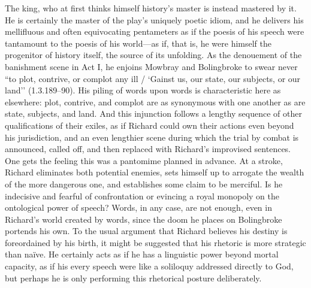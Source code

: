 The king, who at first thinks himself history’s master is instead mastered by it.
He is certainly the master of the play’s uniquely poetic idiom, and he delivers his mellifluous and often equivocating pentameters as if the poesis of his speech were tantamount to the poesis of his world---as if, that is, he were himself the progenitor of history itself, the source of its unfolding.
As the denouement of the banishment scene in Act I, he enjoins Mowbray and Bolingbroke to swear never ``to plot, contrive, or complot any ill / ‘Gainst us, our state, our subjects, or our land’’ (1.3.189--90).
His piling of words upon words is characteristic here as elsewhere: plot, contrive, and complot are as synonymous with one another as are state, subjects, and land.
And this injunction follows a lengthy sequence of other qualifications of their exiles, as if Richard could own their actions even beyond his jurisdiction, and an even lengthier scene during which the trial by combat is announced, called off, and then replaced with Richard’s improvised sentences.
One gets the feeling this was a pantomime planned in advance.
At a stroke, Richard eliminates both potential enemies, sets himself up to arrogate the wealth of the more dangerous one, and establishes some claim to be merciful.
Is he indecisive and fearful of confrontation or evincing a royal monopoly on the ontological power of speech? Words, in any case, are not enough, even in Richard’s world created by words, since the doom he places on Bolingbroke portends his own.
To the usual argument that Richard believes his destiny is foreordained by his birth, it might be suggested that his rhetoric is more strategic than naïve.
He certainly acts as if he has a linguistic power beyond mortal capacity, as if his every speech were like a soliloquy addressed directly to God, but perhaps he is only performing this rhetorical posture deliberately.

